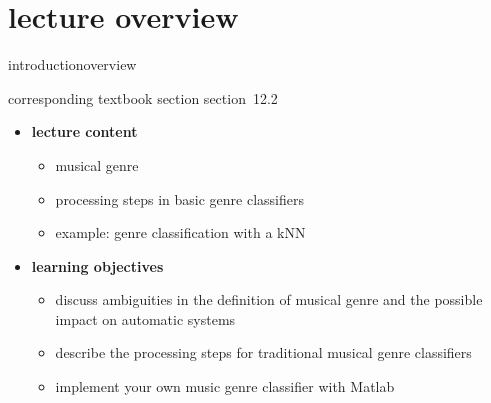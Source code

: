 


\subtitle{module 12.2: musical genre classification}


	

    \section[overview]{lecture overview}
        \begin{frame}{introduction}{overview}
            \begin{block}{corresponding textbook section}
                    section~12.2
            \end{block}

            \begin{itemize}
                \item   \textbf{lecture content}
                    \begin{itemize}
                        \item   musical genre
                        \item   processing steps in basic genre classifiers
                        \item   example: genre classification with a kNN
                    \end{itemize}
                \bigskip
                \item<2->   \textbf{learning objectives}
                    \begin{itemize}
                        \item   discuss ambiguities in the definition of musical genre and the possible impact on automatic systems
                        \item   describe the processing steps for traditional musical genre classifiers
                        \item   implement your own music genre classifier with Matlab
                    \end{itemize}
            \end{itemize}
        \end{frame}


